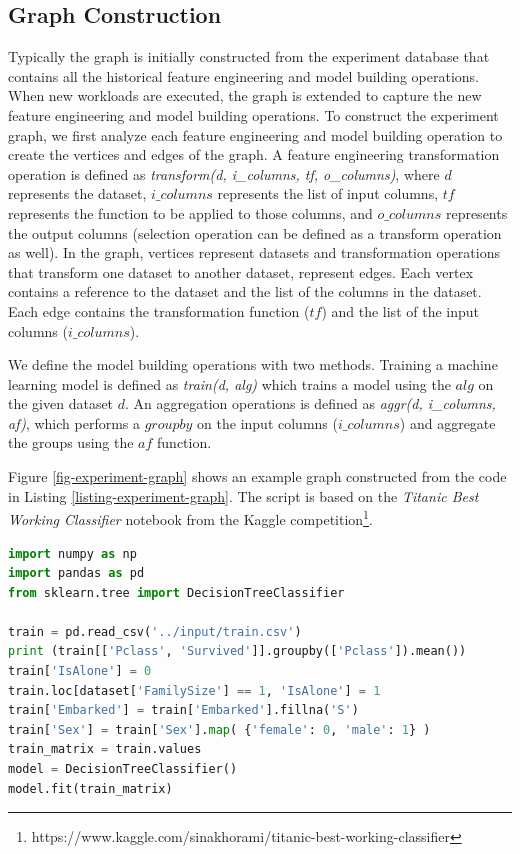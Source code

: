 \subsection{Graph Construction}
Typically the graph is initially constructed from the experiment database that contains all the historical feature engineering and model building operations.
When new workloads are executed, the graph is extended to capture the new feature engineering and model building operations.
To construct the experiment graph, we first analyze each feature engineering and model building operation to create the vertices and edges of the graph.
A feature engineering transformation operation is defined as \textit{transform(d, i\_columns, tf, o\_columns)}, where $d$ represents the dataset, $i\_columns$ represents the list of input columns, $tf$ represents the function to be applied to those columns, and $o\_columns$ represents the output columns (selection operation can be defined as a transform operation as well). 
In the graph, vertices represent datasets and transformation operations that transform one dataset to another dataset, represent edges.
Each vertex contains a reference to the dataset and the list of the columns in the dataset.
Each edge contains the transformation function ($tf$) and the list of the input columns ($i\_columns$).

We define the model building operations with two methods.
Training a machine learning model is defined as \textit{train(d, alg)} which trains a model using the $alg$ on the given dataset $d$.
An aggregation operations is defined as \textit{aggr(d, i\_columns, af)}, which performs a $groupby$ on the input columns ($i\_columns$) and aggregate the groups using the $af$ function.

Figure \ref{fig-experiment-graph} shows an example graph constructed from the code in Listing \ref{listing-experiment-graph}.
The script is based on the \textit{Titanic Best Working Classifier} notebook from the Kaggle competition\footnote{https://www.kaggle.com/sinakhorami/titanic-best-working-classifier}.

\begin{lstlisting}[language=Python, caption=Example script,captionpos=b,label = {listing-experiment-graph}]
import numpy as np
import pandas as pd
from sklearn.tree import DecisionTreeClassifier

train = pd.read_csv('../input/train.csv')
print (train[['Pclass', 'Survived']].groupby(['Pclass']).mean())
train['IsAlone'] = 0
train.loc[dataset['FamilySize'] == 1, 'IsAlone'] = 1
train['Embarked'] = train['Embarked'].fillna('S') 
train['Sex'] = train['Sex'].map( {'female': 0, 'male': 1} )
train_matrix = train.values
model = DecisionTreeClassifier()
model.fit(train_matrix)
\end{lstlisting}

